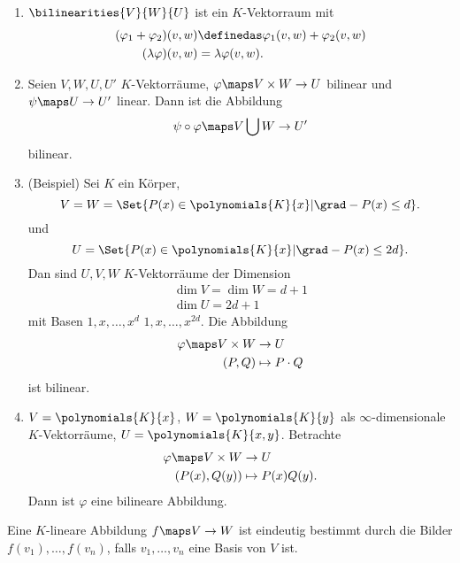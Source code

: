 \begin{bemerkungen*}
  \begin{enumerate}
    \item \( \bilinearities{V}{W}{U} \) ist ein \( K \)-Vektorraum mit
    \begin{align*}
      (\varphi_1+\varphi_2)(v,w)&\definedas \varphi_1(v,w)+\varphi_2(v,w)\\
      (\lambda \varphi)(v,w)&=\lambda \varphi(v,w).
    \end{align*}
    \item Seien \( V,W,U,U'\) \( K \)-Vektorräume, \( \varphi\maps V\times W\to U \) bilinear und \( \psi\maps U\to U' \) linear. Dann ist die Abbildung 
    \begin{equation*}
      \psi\circ \varphi\maps V\bigcup W\to U'
    \end{equation*}
    bilinear.
    \item \label{bilinearitaet_beispiel} (Beispiel) Sei \( K \) ein Körper,
    \begin{equation*}
      V=W=\Set{P(x)\in \polynomials{K}{x}|\grad-{P(x)}\leq d}.
    \end{equation*}
    und
    \begin{equation*}
      U=\Set{P(x)\in \polynomials{K}{x}|\grad-{P(x)}\leq 2d}.
    \end{equation*}
    Dan sind \( U,V,W \) \( K \)-Vektorräume der Dimension
    \begin{gather*}
      \dim{V}=\dim{W}=d+1\\
      \dim{U}=2d+1
    \end{gather*}
    mit Basen \( 1,x,\dotsc,x^d \) \bzw \( 1,x,\dotsc,x^{2d} \). Die Abbildung
    \begin{align*}
      \varphi\maps V\times W&\to U\\
      (P,Q)&\mapsto P\cdot Q
    \end{align*}
    ist bilinear.
    \item \( V=\polynomials{K}{x} \), \( W=\polynomials{K}{y} \) als \( \infty \)-dimensionale \( K \)-Vektorräume, \( U=\polynomials{K}{x,y} \). Betrachte
    \begin{align*}
      \varphi\maps V\times W&\to U\\
      (P(x),Q(y))&\mapsto P(x)Q(y).
    \end{align*}
    Dann ist \( \varphi \) eine bilineare Abbildung.
  \end{enumerate}
\end{bemerkungen*}
\begin{erinnerung*}
  Eine \( K \)-lineare Abbildung \( f\maps V\to W \) ist eindeutig bestimmt durch die Bilder \( f(v_1),\dotsc,f(v_n) \), falls \( v_1,\dotsc,v_n \) eine Basis von \( V \) ist.
\end{erinnerung*}
